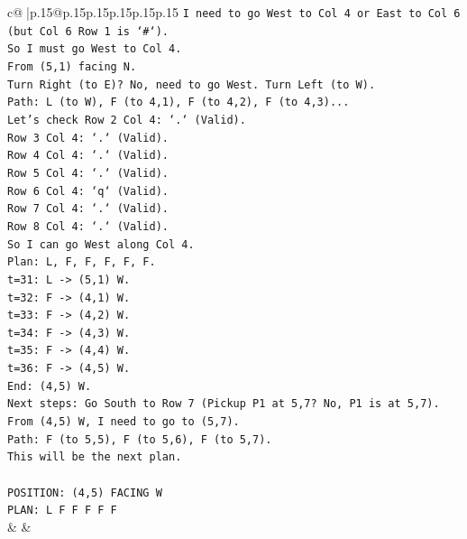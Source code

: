 \documentclass{article}
\begin{document}
{\begin{supertabular}{c@{$\;$}|p{.15\linewidth}@{}p{.15\linewidth}p{.15\linewidth}p{.15\linewidth}p{.15\linewidth}p{.15\linewidth}}
{{{\texttt{I need to go West to Col 4 or East to Col 6 (but Col 6 Row 1 is `\#`).} \\
\texttt{So I must go West to Col 4.} \\
\texttt{From (5,1) facing N.} \\
\texttt{Turn Right (to E)? No, need to go West. Turn Left (to W).} \\
\texttt{Path: L (to W), F (to 4,1), F (to 4,2), F (to 4,3)...} \\
\texttt{Let's check Row 2 Col 4: `.` (Valid).} \\
\texttt{Row 3 Col 4: `.` (Valid).} \\
\texttt{Row 4 Col 4: `.` (Valid).} \\
\texttt{Row 5 Col 4: `.` (Valid).} \\
\texttt{Row 6 Col 4: `q` (Valid).} \\
\texttt{Row 7 Col 4: `.` (Valid).} \\
\texttt{Row 8 Col 4: `.` (Valid).} \\
\texttt{So I can go West along Col 4.} \\
\texttt{Plan: L, F, F, F, F, F.} \\
\texttt{t=31: L {-}> (5,1) W.} \\
\texttt{t=32: F {-}> (4,1) W.} \\
\texttt{t=33: F {-}> (4,2) W.} \\
\texttt{t=34: F {-}> (4,3) W.} \\
\texttt{t=35: F {-}> (4,4) W.} \\
\texttt{t=36: F {-}> (4,5) W.} \\
\texttt{End: (4,5) W.} \\
\texttt{Next steps: Go South to Row 7 (Pickup P1 at 5,7? No, P1 is at 5,7).} \\
\texttt{From (4,5) W, I need to go to (5,7).} \\
\texttt{Path: F (to 5,5), F (to 5,6), F (to 5,7).} \\
\texttt{This will be the next plan.} \\
\\ 
\texttt{POSITION: (4,5) FACING W} \\
\texttt{PLAN: L F F F F F} \\
            }
        }
    }
    & & \\ \\


\end{supertabular}}
\end{document}
